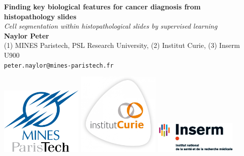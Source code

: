 \documentclass[a0,portrait]{a0poster}
\begin{document}


\begin{minipage}[b]{0.75\linewidth}
\veryHuge \color{NavyBlue} \textbf{Finding key biological features for cancer diagnosis from histopathology slides
} \color{Black}\\ %
\Huge\textit{Cell segmentation within histopathological slides by
  supervised learning}\\[2cm] %
\huge \textbf{Naylor Peter}\\[0.5cm] %
\huge (1) MINES Paristech, PSL Research University, (2) Institut
Curie, (3) Inserm U900\\[0.4cm] %
\Large \texttt{peter.naylor@mines-paristech.fr} \\
\end{minipage}
%
\begin{minipage}[b]{0.3\linewidth}
\includegraphics[width=0.3\textwidth]{Mines_ParisTech.png} 
\includegraphics[width=0.3\textwidth]{CURIE.jpg}
\includegraphics[width=0.3\textwidth]{INSERM.jpg}
\end{minipage}
\end{document}
